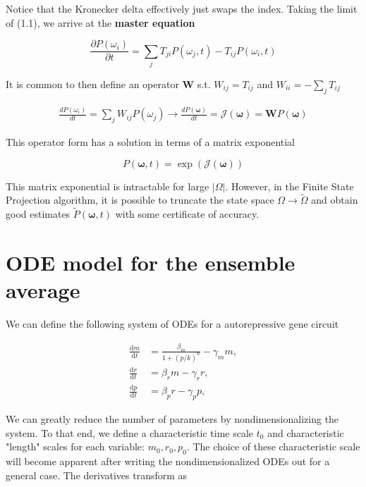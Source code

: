 \documentclass{ucetd}
\begin{document}
Notice that the Kronecker delta effectively just swaps the index. Taking the limit of (1.1), we arrive at the \textbf{master equation}


\begin{equation*}
\frac{\partial P(\omega_{i})}{\partial t} = \sum_{j}T_{ji}P(\omega_{j},t) - T_{ij}P(\omega_{i},t)
\end{equation*}

It is common to then define an operator $\bm{W}$ s.t. $W_{ij} = T_{ij}$ and $W_{ii} = -\sum_{j}T_{ij}$ 

\begin{align*}
\frac{dP(\omega_{i})}{dt} = \sum_{j}W_{ij}P(\omega_{j}) \rightarrow \frac{dP(\bm{\omega})}{dt} = \mathcal{J}(\bm{\omega}) = \mathbf{W}P(\bm{\omega})
\end{align*}

This operator form has a solution in terms of a matrix exponential

\begin{equation*}
P(\bm{\omega}, t) = \exp(\mathcal{J}(\bm{\omega}))
\end{equation*}

This matrix exponential is intractable for large $|\Omega|$. However, in the Finite State Projection algorithm, it is possible to truncate the state space $\Omega \rightarrow \tilde{\Omega}$ and obtain good estimates $\tilde{P}(\bm{\omega}, t)$ with some certificate of accuracy.



\section{ODE model for the ensemble average}

We can define the following system of ODEs for a autorepressive gene circuit

\begin{align}
\frac{\mathrm{d}m}{\mathrm{d}t} &= \frac{\beta_{m}}{1 + (p/k)^n} - \gamma_m m,\\[1em]
\frac{\mathrm{d}r}{\mathrm{d}t} &= \beta_{r} m - \gamma_r r,\\[1em]
\frac{\mathrm{d}p}{\mathrm{d}t} &= \beta_{p} r - \gamma_{p} p,
\end{align}

We can greatly reduce the number of parameters by nondimensionalizing the system. To that end, we define a characteristic time scale $t_{0}$ and characteristic "length" scales for each variable: $m_{0}, r_{0}, p_{0}$. The choice of these characteristic scale will become apparent after writing the nondimensionalized ODEs out for a general case. The derivatives transform as
\end{document}
